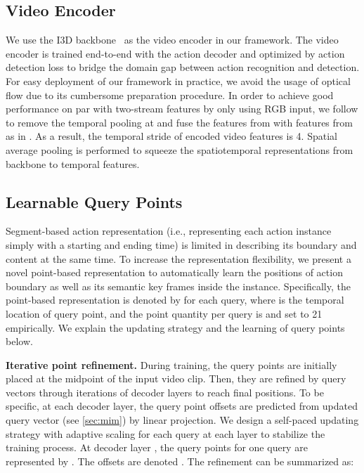 \documentclass{article}
\renewcommand{\paragraph}[1]{\vspace{1.25mm}\noindent\textbf{#1}}
\begin{document}
\subsection{Video Encoder}
We use the I3D backbone~\cite{DBLP:conf/cvpr/CarreiraZ17} as the video encoder in our framework. The video encoder is trained end-to-end with the action decoder and optimized by action detection loss to bridge the domain gap between action recognition and detection. 
For easy deployment of our framework in practice, we avoid the usage of optical flow due to its cumbersome preparation procedure. 
In order to achieve good performance on par with two-stream features by only using RGB input, we follow \cite{DBLP:journals/corr/abs-2205-02717} to remove the temporal pooling at  and fuse the features from  with features from  as in  \cite{liu2022an}. As a result, the temporal stride of encoded video features is 4. Spatial average pooling is performed to squeeze the spatiotemporal representations from backbone to temporal features.

\subsection{Learnable Query Points}
Segment-based action representation (i.e., representing each action instance simply with a starting and ending time) is limited in describing its boundary and content at the same time. To increase the representation flexibility, we present a novel point-based representation to automatically learn the positions of action boundary as well as its semantic key frames inside the instance. Specifically, the point-based representation is denoted by  for each query, where  is the temporal location of  query point, and the point quantity per query is  and set to 21 empirically. 
We explain the updating strategy and the learning of query points below.

\paragraph{Iterative point refinement.}
During training, the query points are initially placed at the midpoint of the input video clip. Then, they are refined by query vectors  through iterations of decoder layers to reach final positions. To be specific, at each decoder layer, the query point offsets are predicted from updated query vector (see \cref{sec:mim}) by linear projection. We design a self-paced updating strategy with adaptive scaling for each query at each layer to stabilize the training process. At decoder layer , the query points for one query are represented by .  The  offsets are denoted . The refinement can be summarized as:
\end{document}
